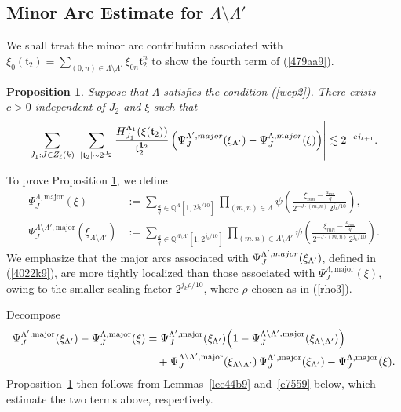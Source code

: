 \documentclass[10pt,a4paper]{amsart}
\newtheorem{proposition}{Proposition}\numberwithin{proposition}{section}
\numberwithin{equation}{section}
\begin{document}
\subsection{Minor Arc Estimate for $\Lambda\setminus \Lambda'$}\label{5.4}
We  shall    treat the minor arc contribution associated with $\xi_0(\mathfrak{t}_2)=\sum_{(0,n)\in \Lambda\setminus \Lambda'} \xi_{0n}\mathfrak{t}_2^n$ to show   the fourth   term of (\ref{479aa9}). 
\begin{proposition}\label{prop7449}  
Suppose that $\Lambda$ satisfies   the  condition (\ref{wep2}). There exists $c>0$ independent of $J_2$ and  $\xi$ such that
$$\sum_{J_1:J\in Z_\ell(k)}\left|\sum_{|\mathfrak{t}_2|\sim 2^{J_2} }   \frac{H^{\Lambda_{1}}_{J_1}(\xi(\mathfrak{t}_2))}{\mathfrak{t}_2^{{\bf 1}_2} }  \left(\Psi^{\Lambda',\rm{major}}_{J}(\xi_{\Lambda'})-  \Psi^{\Lambda,\rm{major}}_{J}(\xi)  \right)\right|\lesssim 2^{-cj_{\ell+1}}.$$
\end{proposition}
To prove Proposition \ref{prop7449}, we define
\begin{align}\label{dom1}
\Psi_J^{\Lambda,\mathrm{major}}(\xi)
&:= \sum_{\frac{a}{q} \in \mathbb{Q}^{\Lambda}[1,2^{j_k/10}]}
\prod_{(m,n)\in \Lambda} 
\psi\left(
\frac{\xi_{mn}-\frac{a_{mn}}{q}}{2^{-J\cdot (m,n)}\,2^{j_k/10}}
\right),\\
\Psi_J^{\Lambda\setminus\Lambda',\mathrm{major}}(\xi_{\Lambda\setminus\Lambda'})
&:= \sum_{\frac{a}{q} \in \mathbb{Q}^{\Lambda\setminus\Lambda'}[1,2^{j_k/10}]}
\prod_{(m,n)\in \Lambda\setminus\Lambda'} 
\psi\left(
\frac{\xi_{mn}-\frac{a_{mn}}{q}}{2^{-J\cdot (m,n)}\,2^{j_k/10}}
\right).\nonumber
\end{align}
We emphasize that the major arcs associated with $\Psi^{\Lambda',\rm{major}}_{J}(\xi_{\Lambda'})$, defined in (\ref{4022k9}), are more tightly localized than those associated with $\Psi_J^{\Lambda,\mathrm{major}}(\xi)$, owing to the smaller scaling factor $2^{j_k\rho/10}$,  where  $\rho$ chosen  as in (\ref{rho3}). 

Decompose
\begin{align*}
\Psi_J^{\Lambda',\mathrm{major}}(\xi_{\Lambda'})
- \Psi_J^{\Lambda,\mathrm{major}}(\xi)
&=
\Psi_{J}^{\Lambda',\mathrm{major}}(\xi_{\Lambda'})
\Bigl(1 - \Psi_J^{\Lambda\setminus\Lambda',\mathrm{major}}(\xi_{\Lambda\setminus\Lambda'})\Bigr) \\
&\quad
+ \Psi_J^{\Lambda\setminus\Lambda',\mathrm{major}}(\xi_{\Lambda\setminus\Lambda'})\,
\Psi_{J}^{\Lambda',\mathrm{major}}(\xi_{\Lambda'})
- \Psi_J^{\Lambda,\mathrm{major}}(\xi).
\end{align*}
Proposition~\ref{prop7449} then follows from Lemmas~\ref{lee44b9} and~\ref{e7559} below, which estimate the two terms above, respectively.
\end{document}
